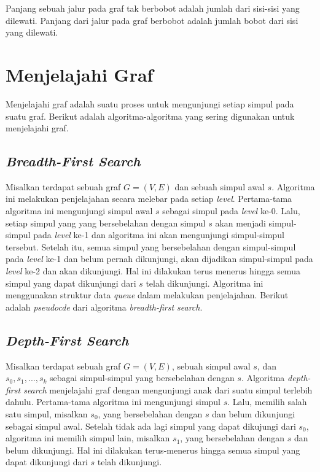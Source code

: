 Panjang sebuah jalur pada graf tak berbobot adalah jumlah dari sisi-sisi yang dilewati. 
Panjang dari jalur pada graf berbobot adalah jumlah bobot dari sisi yang dilewati.

\section{Menjelajahi Graf}

Menjelajahi graf adalah suatu proses untuk mengunjungi setiap simpul pada suatu graf. 
Berikut adalah algoritma-algoritma yang sering digunakan untuk menjelajahi graf.

    \subsection{\textit{Breadth-First Search}}
    Misalkan terdapat sebuah graf $G = (V, E)$ dan sebuah simpul awal $s$. Algoritma ini 
    melakukan penjelajahan secara melebar pada setiap \textit{level}. Pertama-tama 
    algoritma ini mengunjungi simpul awal $s$ sebagai simpul pada \textit{level} ke-0. 
    Lalu, setiap simpul yang yang bersebelahan dengan simpul $s$ akan menjadi 
    simpul-simpul pada \textit{level} ke-1 dan algoritma ini akan mengunjungi 
    simpul-simpul tersebut. Setelah itu, semua simpul yang bersebelahan dengan 
    simpul-simpul pada \textit{level} ke-1 dan belum pernah dikunjungi, akan dijadikan 
    simpul-simpul pada \textit{level} ke-2 dan akan dikunjungi. Hal ini dilakukan terus 
    menerus hingga semua simpul yang dapat dikunjungi dari $s$  telah dikunjungi. 
    Algoritma ini menggunakan struktur data \textit{queue} dalam melakukan penjelajahan. 
    Berikut adalah \textit{pseudocde} dari algoritma \textit{breadth-first search}.

    \medskip
    

    \subsection{\textit{Depth-First Search}}
    Misalkan terdapat sebuah graf $G = (V, E)$, sebuah simpul awal $s$, dan 
    $s_{0}, s_{1}, ..., s_{k}$ sebagai simpul-simpul yang bersebelahan dengan $s$. 
    Algoritma \textit{depth-first search} menjelajahi graf dengan mengunjungi anak dari 
    suatu simpul terlebih dahulu. Pertama-tama algoritma ini mengunjungi simpul $s$. 
    Lalu, memilih salah satu simpul, misalkan $s_{0}$, yang bersebelahan dengan $s$ dan 
    belum dikunjungi sebagai simpul awal. Setelah tidak ada lagi simpul yang dapat 
    dikujungi dari $s_{0}$, algoritma ini memilih simpul lain, misalkan $s_{1}$, yang 
    bersebelahan dengan $s$ dan belum dikunjungi. Hal ini dilakukan terus-menerus hingga 
    semua simpul yang dapat dikunjungi dari $s$ telah dikunjungi.

